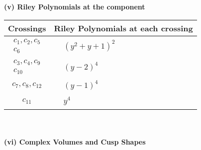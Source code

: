 \documentclass[1p]{elsarticle_modified}
\theoremstyle{definition}
\begin{document}
\newpage\renewcommand{\arraystretch}{1}
\flushleft \textbf{(v) Riley Polynomials at the component}\newline \\
\begin{tabular}{m{50pt}|m{274pt}}
Crossings & \hspace{64pt}Riley Polynomials at each crossing \\
\hline $$\begin{aligned}c_{1},c_{2},c_{5}\\c_{6}\end{aligned}$$&$\begin{aligned}
&(y^2+y+1)^2
\end{aligned}$\\
\hline $$\begin{aligned}c_{3},c_{4},c_{9}\\c_{10}\end{aligned}$$&$\begin{aligned}
&(y-2)^4
\end{aligned}$\\
\hline $$\begin{aligned}c_{7},c_{8},c_{12}\end{aligned}$$&$\begin{aligned}
&(y-1)^4
\end{aligned}$\\
\hline $$\begin{aligned}c_{11}\end{aligned}$$&$\begin{aligned}
&y^4
\end{aligned}$\\
\hline
\end{tabular}\\~\\
\newpage\flushleft \textbf{(vi) Complex Volumes and Cusp Shapes}
\end{document}
